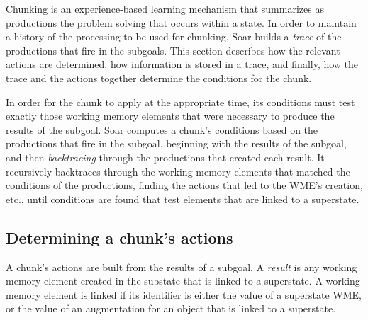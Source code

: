 Chunking is an experience-based learning mechanism that summarizes  as 
productions the problem solving that occurs within a state. In order to 
maintain a
history of the processing to be used for chunking, Soar builds a 
\emph{trace} of the productions that fire in the subgoals. This section
describes how the relevant actions are determined, how information is 
stored in a trace, and finally, how the trace and the actions together 
determine the conditions for the chunk.

In order for the chunk to apply at the appropriate time, its conditions must
test exactly those working memory elements that were necessary to produce the
results of the subgoal. 
Soar computes a chunk's conditions based on the
productions that fire in the subgoal, beginning with the results of
the subgoal,
and then \emph{backtracing} through the productions that created 
each result.  It recursively backtraces through the working memory
elements that matched the conditions of the productions, finding the
actions that led to the WME's creation, etc., until conditions are
found that test elements that are linked to a superstate.



\subsection{Determining a chunk's actions}

A chunk's actions are built from the results of a subgoal.  A \emph{result} is
any working memory element created in the substate that is linked to a 
superstate.  A working memory element
is linked if its identifier is either the value of a superstate
WME, or the value of an augmentation  for an object that is linked to a
superstate.

